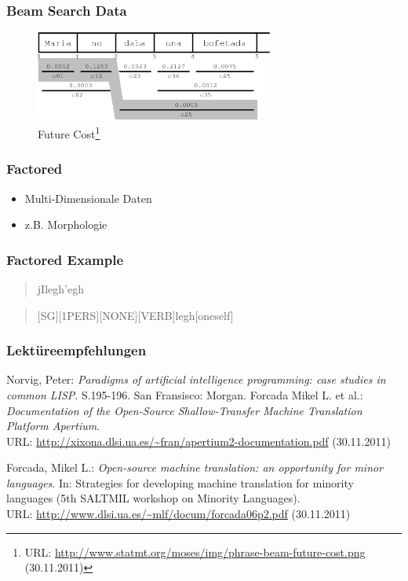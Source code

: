 \documentclass{beamer}
\begin{document}
\begin{frame}
  \frametitle{Beam Search Data}
  \begin{figure}
  \includegraphics[width=0.70\textwidth]{graphics/future_cost}
  \caption{Future Cost\footnote{URL:
      \url{http://www.statmt.org/moses/img/phrase-beam-future-cost.png} (30.11.2011)}}
  \end{figure}
\end{frame}
\begin{frame}
  \frametitle{Factored}
  \begin{itemize}
    \item Multi-Dimensionale Daten
    \item z.B. Morphologie
  \end{itemize}
\end{frame}
\begin{frame}
  \frametitle{Factored Example}
  
  \begin{quote}
    jIlegh'egh
  \end{quote}
  \begin{quote}
    [SG][1PERS][NONE][VERB]legh[oneself]
  \end{quote}
\end{frame}
\begin{frame}
  \frametitle{Lektüreempfehlungen}

\begin{thebibliography}{...............}
\small
{}
Norvig, Peter: \emph{Paradigms of artificial intelligence programming: case studies in common LISP}. S.195-196. San Fransisco: Morgan.
Forcada Mikel L. et al.: \emph{Documentation of the Open-Source Shallow-Transfer Machine Translation Platform Apertium}.\\
URL: \url{http://xixona.dlsi.ua.es/~fran/apertium2-documentation.pdf} (30.11.2011)

Forcada, Mikel L.: \emph{Open-source machine translation: an opportunity for minor languages}. In: Strategies for developing machine translation for minority languages (5th SALTMIL workshop on Minority Languages).\\URL: \url{http://www.dlsi.ua.es/~mlf/docum/forcada06p2.pdf} (30.11.2011)
\end{thebibliography}

\end{frame}
\end{document}
